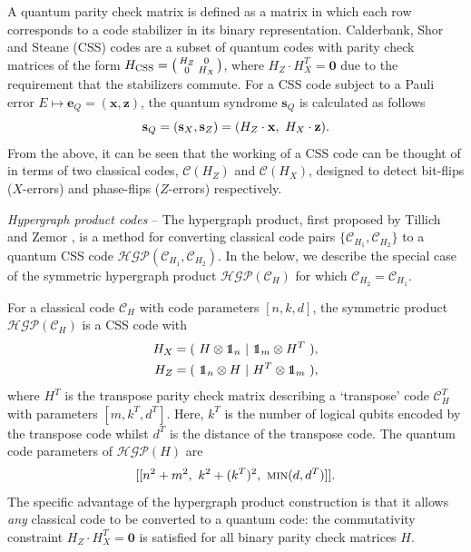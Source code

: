 \documentclass[%
 reprint,
superscriptaddress,
nofootinbib,
 amsmath,amssymb,
secnumarabic
]{revtex4-1}
\DeclareRobustCommand\openone{\leavevmode\hbox{\small1\normalsize\kern-.33em1}}
\begin{document}
A quantum parity check matrix is defined as a matrix in which each row corresponds to a code stabilizer in its binary representation. Calderbank, Shor and Steane (CSS) codes \cite{Calderbank95,Steane96b,Steane97} are a subset of quantum codes with parity check matrices of the form $H_{\rm CSS}=\left(\begin{smallmatrix}H_Z & 0\\0&H_X\end{smallmatrix}\right)$, where $H_Z\cdot H_X^T=\mathbf{0}$ due to the requirement that the stabilizers commute. For a CSS code subject to a Pauli error $E\mapsto \mathbf{e}_Q=(\mathbf{x},\mathbf{z})$, the quantum syndrome $\mathbf{s}_Q$ is calculated as follows 
\begin{equation}
\mathbf{s}_Q=(\mathbf{s}_X,\mathbf{s}_Z)=(H_Z\cdot\mathbf{x}, \ H_X\cdot \mathbf{z})\rm.
\end{equation} From the above, it can be seen that the working of a CSS code can be thought of in terms of two classical codes, $\mathcal{C}(H_Z)$ and $\mathcal{C}(H_X)$, designed to detect bit-flips ($X$-errors) and phase-flips ($Z$-errors) respectively. 

\textit{Hypergraph product codes} -- The hypergraph product, first proposed by Tillich and Zemor \cite{tillich2013quantum}, is a method for converting classical code pairs $\{\mathcal{C}_{H_1},\mathcal{C}_{H_2}\}$ to a quantum CSS code $\mathcal{HGP}(\mathcal{C}_{H_1},\mathcal{C}_{H_2})$. In the below, we describe the special case of the symmetric hypergraph product $\mathcal{HGP}(\mathcal{C}_H)$ for which $\mathcal{C}_{H_2}=\mathcal{C}_{H_1}$. %

For a classical code $\mathcal{C}_H$ with code parameters $[n,k,d]$, the symmetric product $\mathcal{HGP}(\mathcal{C}_H)$ is a CSS code with
\begin{equation}\label{eq:hgp_h}
\begin{split}
H_X=( \ H \otimes \openone_{n} \ | \ \openone_{m} \otimes H^T \ ){\rm,}\\
H_Z = (\ \openone_{n} \otimes H \ | \ H^T \otimes \openone_{m} \ )\rm,
\end{split}
\end{equation}
where $H^T$ is the transpose parity check matrix describing a `transpose' code $\mathcal{C}_{H}^T$ with parameters $[m,k^T,d^T]$. Here, $k^T$ is the number of logical qubits encoded by the transpose code whilst $d^T$ is the distance of the transpose code.  The quantum code parameters of $\mathcal{HGP}(H)$ are \begin{equation}\label{eq:hgp_params}
[[n^2+m^2,\ k^2+(k^T)^2,\ {\text{\sc min}}(d,d^T)]]\rm.
\end{equation}
The specific advantage of the hypergraph product construction is that it allows \textit{any} classical code to be converted to a quantum code: the commutativity constraint $H_Z\cdot H_X^T=\mathbf{0}$ is satisfied for all  binary parity check matrices $H$.
\end{document}
